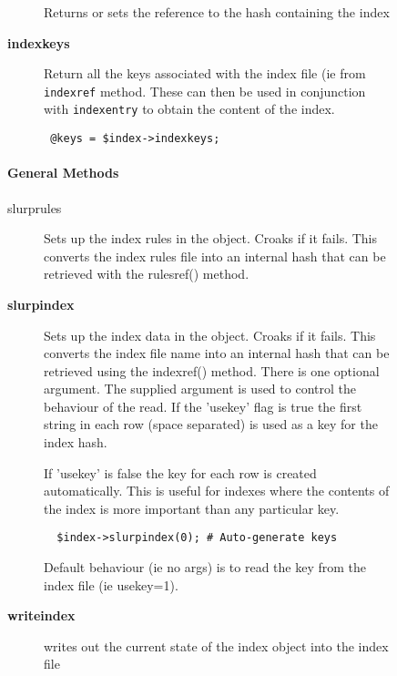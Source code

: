 \begin{description}
\begin{description}
\begin{description}
Returns or sets the reference to the hash containing the index


\item[{\textbf{indexkeys}}] \mbox{}

Return all the keys associated with the index file (ie from \texttt{indexref}
method. These can then be used in conjunction with \texttt{indexentry} to obtain
the content of the index.

\begin{verbatim}
 @keys = $index->indexkeys;
\end{verbatim}
\end{description}
\paragraph*{General Methods\label{ORAC::Index_General_Methods}}
\begin{description}

\item[{slurprules}] \mbox{}

Sets up the index rules in the object. Croaks if it fails.
This converts the index rules file into an internal hash
that can be retrieved with the rulesref() method.


\item[{\textbf{slurpindex}}] \mbox{}

Sets up the index data in the object. Croaks if it fails.  This
converts the index file name into an internal hash that can be
retrieved using the indexref() method.  There is one optional
argument.  The supplied argument is used to control the behaviour of
the read. If the 'usekey' flag is true the first string in each row
(space separated) is used as a key for the index hash.



If 'usekey' is false the key for each row is created
automatically. This is useful for indexes where the contents
of the index is more important than any particular key.

\begin{verbatim}
  $index->slurpindex(0); # Auto-generate keys
\end{verbatim}


Default behaviour (ie no args) is to read the key from the
index file (ie usekey=1).


\item[{\textbf{writeindex}}] \mbox{}

writes out the current state of the index object into the index file



\end{description}
\end{description}
\end{description}
